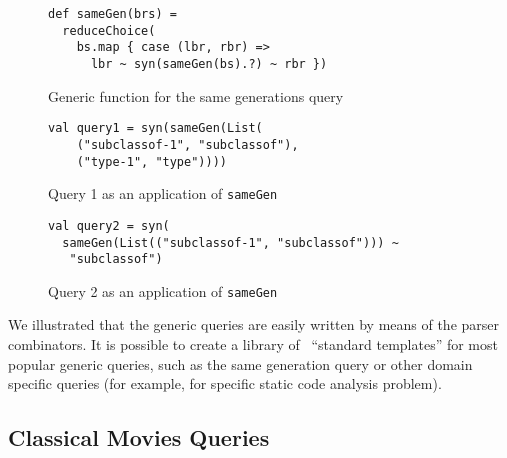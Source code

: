 
\begin{figure}[h]
\begin{lstlisting}
def sameGen(brs) =
  reduceChoice(
    bs.map { case (lbr, rbr) =>
      lbr ~ syn(sameGen(bs).?) ~ rbr })
\end{lstlisting}
\caption{Generic function for the same generations query}
\label{fig:gen}
\end{figure}


\begin{figure}[h]
\begin{lstlisting}
val query1 = syn(sameGen(List(
    ("subclassof-1", "subclassof"),
    ("type-1", "type"))))
\end{lstlisting}
\caption{Query 1 as an application of \lstinline{sameGen}}
\label{fig:query1Gen}
\end{figure}


\begin{figure}[h]
\begin{lstlisting}
val query2 = syn(
  sameGen(List(("subclassof-1", "subclassof"))) ~
   "subclassof")
\end{lstlisting}
\caption{Query 2 as an application of \lstinline{sameGen}}
\label{fig:query2Gen}
\end{figure}


We illustrated that the generic queries are easily written by means of the parser combinators.
It is possible to create a library of \ ``standard templates'' for most popular generic queries, such as the same generation query or other domain specific queries (for example, for specific static code analysis problem).


\subsection{Classical Movies Queries}



